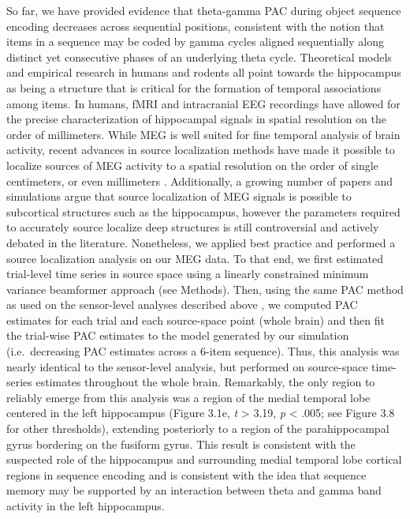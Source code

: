 So far, we have provided evidence that theta-gamma PAC during object
sequence encoding decreases across sequential positions, consistent with
the notion that items in a sequence may be coded by gamma cycles aligned
sequentially along distinct yet consecutive phases of an underlying
theta cycle. Theoretical models
\autocites{jensen_hippocampal_1996}{jensen_hippocampal_2005} and
empirical research in humans
\autocites{dubrow_temporal_2014}{hsieh_hippocampal_2014}{jenkins_prefrontal_2010}{tubridy_medial_2011}{davachi_how_2015}{ezzyat_similarity_2014}
and rodents \autocites{fortin_critical_2002}{kesner_role_2002} all point
towards the hippocampus as being a structure that is critical for the
formation of temporal associations among items. In humans, fMRI and
intracranial EEG recordings have allowed for the precise
characterization of hippocampal signals in spatial resolution on the
order of millimeters. While MEG is well suited for fine temporal
analysis of brain activity, recent advances in source localization
methods have made it possible to localize sources of MEG activity to a
spatial resolution on the order of single centimeters, or even
millimeters \autocite{dalal_spatial_2007}. Additionally, a growing
number of papers
\autocites{attal_assessment_2013}{dalal_simultaneous_2013}{staudigl_theta_2013}
and simulations \autocites{mills_techniques_2012}{quraan_detection_2011}
argue that source localization of MEG signals is possible to subcortical
structures such as the hippocampus, however the parameters required to
accurately source localize deep structures is still controversial and
actively debated in the literature. Nonetheless, we applied best
practice and performed a source localization analysis on our MEG data.
To that end, we first estimated trial-level time series in source space
using a linearly constrained minimum variance beamformer approach (see
Methods). Then, using the same PAC method as used on the sensor-level
analyses described above
\autocites{tort_measuring_2010}{tort_thetagamma_2009}, we computed PAC
estimates for each trial and each source-space point (whole brain) and
then fit the trial-wise PAC estimates to the model generated by our
simulation (i.e.~decreasing PAC estimates across a 6-item sequence).
Thus, this analysis was nearly identical to the sensor-level analysis,
but performed on source-space time-series estimates throughout the whole
brain. Remarkably, the only region to reliably emerge from this analysis
was a region of the medial temporal lobe centered in the left
hippocampus (Figure 3.1e, \emph{t} \textgreater{} 3.19, \emph{p}
\textless{} .005; see Figure 3.8 for other thresholds), extending
posteriorly to a region of the parahippocampal gyrus bordering on the
fusiform gyrus. This result is consistent with the suspected role of the
hippocampus and surrounding medial temporal lobe cortical regions in
sequence encoding
\autocites{dubrow_temporal_2014}{hsieh_hippocampal_2014}{jenkins_prefrontal_2010}{tubridy_medial_2011}
and is consistent with the idea that sequence memory may be supported by
an interaction between theta and gamma band activity in the left
hippocampus.

